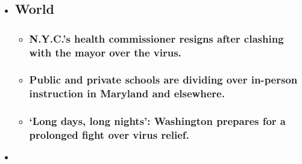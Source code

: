 \begin{itemize}
\item
  \href{https://www.nytimes.com/2020/08/04/world/coronavirus-covid-19.html?type=styln-live-updates\&label=world\&index=0}{}

  \hypertarget{world}{%
  \subsection{World}\label{world}}

  \begin{itemize}
  \item
    \href{https://www.nytimes.com/2020/08/04/world/coronavirus-covid-19.html?type=styln-live-updates\&label=world\&index=0\#link-4d1eafa8}{}

    \hypertarget{nycs-health-commissioner-resigns-after-clashing-with-the-mayor-over-the-virus}{%
    \subsubsection{N.Y.C.'s health commissioner resigns after clashing
    with the mayor over the
    virus.}\label{nycs-health-commissioner-resigns-after-clashing-with-the-mayor-over-the-virus}}
  \item
    \href{https://www.nytimes.com/2020/08/04/world/coronavirus-covid-19.html?type=styln-live-updates\&label=world\&index=0\#link-18bf040e}{}

    \hypertarget{public-and-private-schools-are-dividing-over-in-person-instruction-in-maryland-and-elsewhere}{%
    \subsubsection{Public and private schools are dividing over
    in-person instruction in Maryland and
    elsewhere.}\label{public-and-private-schools-are-dividing-over-in-person-instruction-in-maryland-and-elsewhere}}
  \item
    \href{https://www.nytimes.com/2020/08/04/world/coronavirus-covid-19.html?type=styln-live-updates\&label=world\&index=0\#link-6b644638}{}

    \hypertarget{long-days-long-nights-washington-prepares-for-a-prolonged-fight-over-virus-relief}{%
    \subsubsection{`Long days, long nights': Washington prepares for a
    prolonged fight over virus
    relief.}\label{long-days-long-nights-washington-prepares-for-a-prolonged-fight-over-virus-relief}}
  \end{itemize}
\item
  \href{https://www.nytimes.com/live/2020/08/04/business/stock-market-today-coronavirus?type=styln-live-updates\&label=business\&index=1}{}


\end{itemize}
